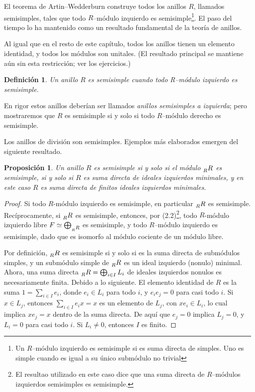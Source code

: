 \documentclass{article}
\newtheorem{definition}{Definición}[section]
\newtheorem{proposition}{Proposición}[section]
\begin{document}
El teorema de Artin--Wedderburn construye todos los anillos $R$, llamados semisimples, tales que todo $R$--módulo izquierdo es semisimple\footnote{Un $R$--módulo izquierdo es semisimple si es suma directa de simples.
Uno es simple cuando es igual a su único submódulo no trivial}.
El paso del tiempo lo ha mantenido como un resultado fundamental de la teoría de anillos.

Al igual que en el resto de este capítulo, todos los anillos tienen un elemento identidad, y todos los módulos son unitales.
(El resultado principal se mantiene aún sin esta restricción; ver los ejercicios.)

\begin{definition}
    Un anillo $R$ es \emph{semisimple} cuando todo R--módulo izquierdo es semisimple.
\end{definition}

En rigor estos anillos deberían ser llamados \emph{anillos semisimples a izquierda}; pero mostraremos que $R$ es semisimple si y solo si todo $R$--módulo derecho es semisimple.

Los anillos de división son semisimples.
Ejemplos más elaborados emergen del siguiente resultado.

\begin{proposition}
    Un anillo $R$ es semisimple si y solo si el módulo \(\prescript{}{R}{R}\) es semisimple, si y solo si $R$ es suma directa de ideales izquierdos minimales, y en este caso $R$ es suma directa de finitos ideales izquierdos minimales.
\end{proposition}

\begin{proof}
    Si todo \(R\)-módulo izquierdo es semisimple, en particular \(\prescript{}{R}{R}\) es semisimple.
    Recíprocamente, si \(\prescript{}{R}{R}\) es semisimple, entonces, por (2.2)\footnote{El resultao utilizado en este caso dice que una suma directa de $R$--módulos izquierdos semisimples es semisimple.}, todo \(R\)-módulo izquierdo libre \(F \simeq \bigoplus_{\prescript{}{R}{R}}\) es semisimple, y todo $R$--módulo izquierdo es semisimple, dado que es isomorfo al módulo cociente de un módulo libre.

    Por definición, \(\prescript{}{R}{R}\) es semisimple si y solo si es la suma directa de submódulos simples, y un submódulo simple de \(\prescript{}{R}{R}\) es un ideal izquierdo (nonulo) minimal.
    Ahora, una suma directa \(\prescript{}{R}{R} = \bigoplus_{i \in I} L_i\) de ideales izquierdos nonulos es necesariamente finita.
    Debido a lo siguiente.
    El elemento identidad de $R$ es la suma $1 = \sum_{i \in I} e_i$, donde $e_i \in L_i$ para todo $i$, y $e_i e_j = 0$ para casi todo $i$.
    Si $x \in L_j$, entonces $\sum_{i \in I} e_i x = x$ es un elemento de $L_j$, con $x e_i \in L_i$, lo cual implica $ x e_j = x$ dentro de la suma directa.
    De aquí que $e_j = 0$ implica $L_j = 0$, y $L_i = 0$ para casi todo $i$.
    Si $L_i \neq 0$, entonces $I$ es finito.
\end{proof}
\end{document}
